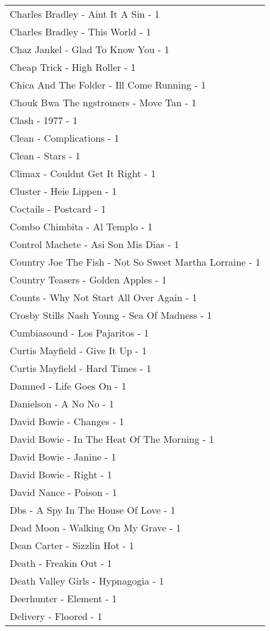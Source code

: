 \documentclass[
]{article}
\begin{document}
\begin{longtable}{l}
Charles Bradley - Aint It A Sin - 1 \\ 
Charles Bradley - This World - 1 \\ 
Chaz Jankel - Glad To Know You - 1 \\ 
Cheap Trick - High Roller - 1 \\ 
Chica And The Folder - Ill Come Running - 1 \\ 
Chouk Bwa The ngstromers - Move Tan - 1 \\ 
Clash - 1977 - 1 \\ 
Clean - Complications - 1 \\ 
Clean - Stars - 1 \\ 
Climax - Couldnt Get It Right - 1 \\ 
Cluster - Heie Lippen - 1 \\ 
Coctails - Postcard - 1 \\ 
Combo Chimbita - Al Templo - 1 \\ 
Control Machete - Asi Son Mis Dias - 1 \\ 
Country Joe The Fish - Not So Sweet Martha Lorraine - 1 \\ 
Country Teasers - Golden Apples - 1 \\ 
Counts - Why Not Start All Over Again - 1 \\ 
Crosby Stills Nash Young - Sea Of Madness - 1 \\ 
Cumbiasound - Los Pajaritos - 1 \\ 
Curtis Mayfield - Give It Up - 1 \\ 
Curtis Mayfield - Hard Times - 1 \\ 
Damned - Life Goes On - 1 \\ 
Danielson - A No No - 1 \\ 
David Bowie - Changes - 1 \\ 
David Bowie - In The Heat Of The Morning - 1 \\ 
David Bowie - Janine - 1 \\ 
David Bowie - Right - 1 \\ 
David Nance - Poison - 1 \\ 
Dbs - A Spy In The House Of Love - 1 \\ 
Dead Moon - Walking On My Grave - 1 \\ 
Dean Carter - Sizzlin Hot - 1 \\ 
Death - Freakin Out - 1 \\ 
Death Valley Girls - Hypnagogia - 1 \\ 
Deerhunter - Element - 1 \\ 
Delivery - Floored - 1 \\ 

\end{longtable}
\end{document}
